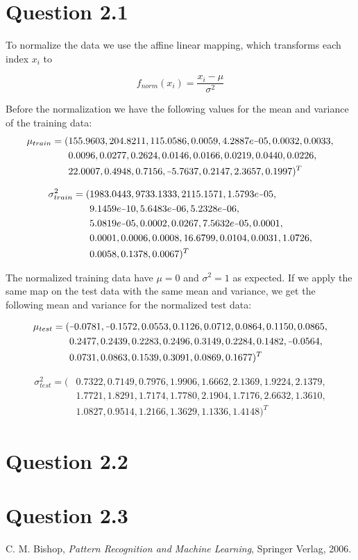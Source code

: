 \documentclass[11pt,a4paper]{article}
\newcommand*{\matminus}{%
  \leavevmode
  \hphantom{0}%
  \llap{%
    \settowidth{\dimen0 }{$0$}%
    \resizebox{\dimen0 }{\height}{$-$}%
  }%
}
\begin{document}
\section{Question 2.1}
To normalize the data we use the affine linear mapping, which transforms each index $x_i$ to

$$ f_{norm}(x_i) = \frac{x_i - \mu}{\sigma^2} $$

Before the normalization we have the following values for the mean and variance of the training data:
\begin{align}
\mu_{train} =  (&155.9603,204.8211,115.0586,0.0059,4.2887e\matminus05,0.0032,0.0033, \\
                &0.0096,0.0277,0.2624,0.0146,0.0166,0.0219,0.0440,0.0226, \\
                &22.0007,0.4948,0.7156,\matminus5.7637,0.2147,2.3657,0.1997)^T
\end{align}

\begin{align}
\sigma^2_{train} = (&1983.0443,9733.1333,2115.1571,1.5793e\matminus05,\\
                    &9.1459e\matminus10,5.6483e\matminus06,5.2328e\matminus06, \\
                    &5.0819e\matminus05,0.0002,0.0267,7.5632e\matminus05,0.0001, \\
                    &0.0001,0.0006,0.0008,16.6799,0.0104,0.0031,1.0726, \\
                    &0.0058,0.1378,0.0067)^T
\end{align}


The normalized training data have $\mu = 0$ and $\sigma^2 = 1$ as expected. If we apply
the same map on the test data with the same mean and variance, we get the following mean
and variance for the normalized test data:

\begin{align} 
\mu_{test} = (&\matminus0.0781,\matminus0.1572,0.0553,0.1126,0.0712,0.0864,0.1150,0.0865, \\
              &0.2477,0.2439,0.2283,0.2496,0.3149,0.2284,0.1482,\matminus0.0564, \\
              &0.0731,0.0863,0.1539,0.3091,0.0869,0.1677)^T
\end{align}

\begin{align}
  \sigma^2_{test} = (&0.7322,0.7149,0.7976,1.9906,1.6662,2.1369,1.9224,2.1379, \\
                     &1.7721,1.8291,1.7174,1.7780,2.1904,1.7176,2.6632,1.3610, \\
                     &1.0827,0.9514,1.2166,1.3629,1.1336,1.4148)^T
\end{align}



\section{Question 2.2}
\section{Question 2.3}

\begin{thebibliography}{9}
        C. M. Bishop,
        \emph{Pattern Recognition and Machine Learning},
        Springer Verlag,
        2006.
\end{thebibliography}
\end{document}
